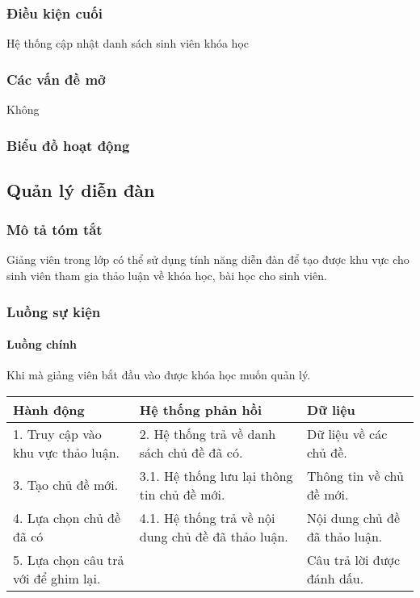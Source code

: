 \documentclass[./../main_file.tex]{subfiles}
\begin{document}
\subsubsection{Điều kiện cuối}
Hệ thống cập nhật danh sách sinh viên khóa học

\subsubsection{Các vấn đề mở}
Không

\subsubsection{Biểu đồ hoạt động}

\subsection{Quản lý diễn đàn}

\subsubsection{Mô tả tóm tắt}
Giảng viên trong lớp có thể sử dụng tính năng diễn đàn để tạo được khu vực cho sinh viên tham gia thảo luận về khóa học, bài học cho sinh viên. 

\subsubsection{Luồng sự kiện}
\paragraph{Luồng chính}
Khi mà giảng viên bắt đầu vào được khóa học muốn quản lý.
\begin{table}[H]
				\begin{tabular}{|p{.33\textwidth}|p{}|p{}|}
		\hline
		\textbf{Hành động}                   & \textbf{Hệ thống phản hồi} & \textbf{Dữ liệu}           \\ \hline
		1. Truy cập vào khu vực thảo luận. & 2. Hệ thống trả về danh sách chủ đề đã có.         & Dữ liệu về các chủ đề.        \\ \hline
		3. Tạo chủ đề mới.                 & 3.1. Hệ thống lưu lại thông tin chủ đề mới.        & Thông tin về chủ đề mới.      \\ \hline
		4. Lựa chọn chủ đề đã có           & 4.1. Hệ thống trả về nội dung chủ đề đã thảo luận. & Nội dung chủ đề đã thảo luận. \\ \hline
		5. Lựa chọn câu trả với để ghim lại. &                            & Câu trả lời được đánh dấu. \\ \hline
	\end{tabular}
\end{table}
\end{document}

